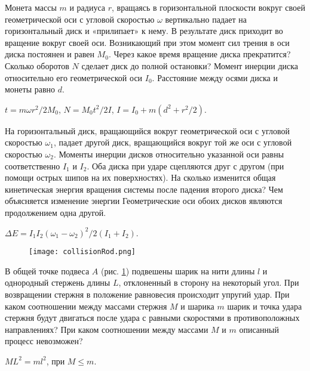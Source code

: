 \begin{ex} %
Монета массы $m$ и радиуса $r$, вращаясь в горизонтальной плоскости вокруг своей геометрической оси с угловой скоростью $\omega$ вертикально падает на горизонтальный диск и «прилипает» к нему. В результате диск приходит во вращение вокруг своей оси. Возникающий при этом момент сил трения в оси диска постоянен и равен $M_0$. Через какое время вращение диска прекратится? Сколько оборотов $N$ сделает диск до полной остановки? Момент инерции диска относительно его геометрической оси $I_0$. Расстояние между осями диска и монеты равно $d$.
\begin{ans}
$t = m\omega r^2 / 2M_0$, $N = M_0t^2/2I$, $I = I_0 + m(d^2 + r^2/2)$.
\end{ans}
\end{ex}	

\begin{ex} %
На горизонтальный диск, вращающийся вокруг геометрической оси с угловой скоростью $\omega_1$, падает другой диск, вращающийся вокруг той же оси с угловой скоростью $\omega_2$. Моменты инерции дисков относительно указанной оси равны соответственно $I_1$ и $I_2$. Оба диска при ударе сцепляются друг с другом (при помощи острых шипов на их поверхностях). На сколько изменится общая кинетическая энергия вращения системы после падения второго диска? Чем объясняется изменение энергии Геометрические оси обоих дисков являются продолжением одна другой.
\begin{ans}
$\Delta E = I_1 I_2 (\omega_1 - \omega_2)^2/ 2(I_1 + I_2)$.
\end{ans}
\end{ex}	

\begin{figure}[h]
\centering
\texttt{[image: collisionRod.png]}
\caption{}
\label{collisionRod}
\end{figure}

\begin{ex} %
В общей точке подвеса $A$ (рис. \ref{collisionRod}) подвешены шарик на нити длины $l$ и однородный стержень длины $L$, отклоненный в сторону на некоторый угол. При возвращении стержня в положение равновесия происходит упругий удар. При каком соотношении между массами стержня $M$ и шарика $m$ шарик и точка удара стержня будут двигаться после удара с равными скоростями
в противоположных направлениях? При каком соотношении между
массами $M$ и $m$ описанный процесс невозможен?
\begin{ans}
$ML^2 = ml^2$, при $M \leq m$.
\end{ans}
\end{ex}	

